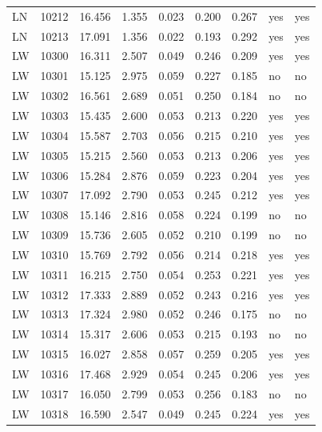 \begin{longtable}{@{}llrrrrrll@{}}
LN & 10212 & 16.456 & 1.355 & 0.023 & 0.200 & 0.267 & yes & yes\\
LN & 10213 & 17.091 & 1.356 & 0.022 & 0.193 & 0.292 & yes & yes\\
LW & 10300 & 16.311 & 2.507 & 0.049 & 0.246 & 0.209 & yes & yes\\
LW & 10301 & 15.125 & 2.975 & 0.059 & 0.227 & 0.185 & no & no\\
LW & 10302 & 16.561 & 2.689 & 0.051 & 0.250 & 0.184 & no & no\\
LW & 10303 & 15.435 & 2.600 & 0.053 & 0.213 & 0.220 & yes & yes\\
LW & 10304 & 15.587 & 2.703 & 0.056 & 0.215 & 0.210 & yes & yes\\
LW & 10305 & 15.215 & 2.560 & 0.053 & 0.213 & 0.206 & yes & yes\\
LW & 10306 & 15.284 & 2.876 & 0.059 & 0.223 & 0.204 & yes & yes\\
LW & 10307 & 17.092 & 2.790 & 0.053 & 0.245 & 0.212 & yes & yes\\
LW & 10308 & 15.146 & 2.816 & 0.058 & 0.224 & 0.199 & no & no\\
LW & 10309 & 15.736 & 2.605 & 0.052 & 0.210 & 0.199 & no & no\\
LW & 10310 & 15.769 & 2.792 & 0.056 & 0.214 & 0.218 & yes & yes\\
LW & 10311 & 16.215 & 2.750 & 0.054 & 0.253 & 0.221 & yes & yes\\
LW & 10312 & 17.333 & 2.889 & 0.052 & 0.243 & 0.216 & yes & yes\\
LW & 10313 & 17.324 & 2.980 & 0.052 & 0.246 & 0.175 & no & no\\
LW & 10314 & 15.317 & 2.606 & 0.053 & 0.215 & 0.193 & no & no\\
LW & 10315 & 16.027 & 2.858 & 0.057 & 0.259 & 0.205 & yes & yes\\
LW & 10316 & 17.468 & 2.929 & 0.054 & 0.245 & 0.206 & yes & yes\\
LW & 10317 & 16.050 & 2.799 & 0.053 & 0.256 & 0.183 & no & no\\
LW & 10318 & 16.590 & 2.547 & 0.049 & 0.245 & 0.224 & yes & yes\\
\end{longtable}\endgroup
